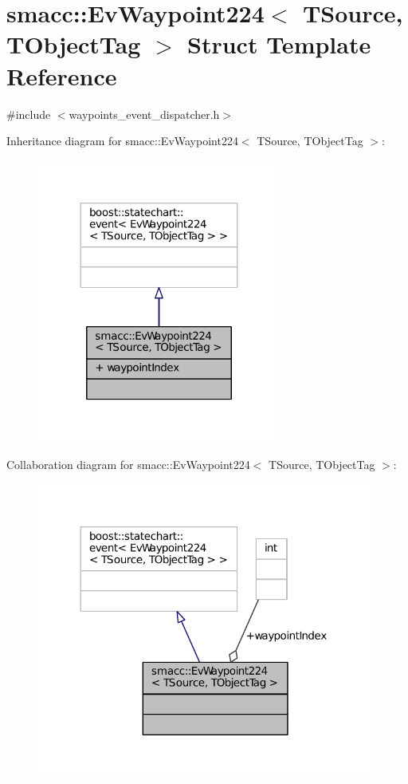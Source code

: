 \hypertarget{structsmacc_1_1EvWaypoint224}{}\section{smacc\+:\+:Ev\+Waypoint224$<$ T\+Source, T\+Object\+Tag $>$ Struct Template Reference}
\label{structsmacc_1_1EvWaypoint224}


{\ttfamily \#include $<$waypoints\+\_\+event\+\_\+dispatcher.\+h$>$}



Inheritance diagram for smacc\+:\+:Ev\+Waypoint224$<$ T\+Source, T\+Object\+Tag $>$\+:
\nopagebreak
\begin{figure}[H]
\begin{center}
\leavevmode
\includegraphics[width=227pt]{structsmacc_1_1EvWaypoint224__inherit__graph}
\end{center}
\end{figure}


Collaboration diagram for smacc\+:\+:Ev\+Waypoint224$<$ T\+Source, T\+Object\+Tag $>$\+:
\nopagebreak
\begin{figure}[H]
\begin{center}
\leavevmode
\includegraphics[width=312pt]{structsmacc_1_1EvWaypoint224__coll__graph}
\end{center}
\end{figure}
